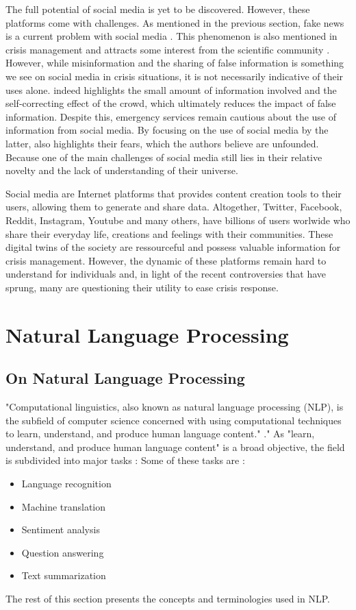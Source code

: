 The full potential of social media is yet to be discovered.
However, these platforms come with challenges.
As mentioned in the previous section, fake news is a current problem with social media \cite{lazerScienceFakeNews2018,vosoughiSpreadTrueFalse2018}.
This phenomenon is also mentioned in crisis management and attracts some interest from the scientific community \cite{starbirdExaminingAlternativeMedia2017,sellMisinformationUSEbola2020}.
However, while misinformation and the sharing of false information is something we see on social media in crisis situations, it is not necessarily indicative of their uses alone.
\cite{bubendorffConstructionDisseminationInformation2021} indeed highlights the small amount of information involved and the self-correcting effect of the crowd, which ultimately reduces the impact of false information.
Despite this, emergency services remain cautious about the use of information from social media.
By focusing on the use of social media by the latter, \cite{tapiaGoodEnoughGood2014} also highlights their fears, which the authors believe are unfounded.
Because one of the main challenges of social media still lies in their relative novelty and the lack of understanding of their universe.

Social media are Internet platforms that provides content creation tools to their users, allowing them to generate and share data.
Altogether, Twitter, Facebook, Reddit, Instagram, Youtube and many others, have billions of users worlwide who share their everyday life, creations and feelings with their communities.
These digital twins of the society are ressourceful and possess valuable information for crisis management.
However, the dynamic of these platforms remain hard to understand for individuals and, in light of the recent controversies that have sprung, many are questioning their utility to ease crisis response.

\section{Natural Language Processing}
\subsection{On Natural Language Processing}
"Computational linguistics, also known as natural language processing (NLP), is the subfield of computer science concerned with using computational techniques to learn, understand, and produce human language content." \cite{hirschbergAdvancesNaturalLanguage2015}."
As "learn, understand, and produce human language content" is a broad objective, the field is subdivided into major tasks :
Some of these tasks are :
\begin{itemize}
    \item Language recognition
    \item Machine translation
    \item Sentiment analysis
    \item Question answering
    \item Text summarization
\end{itemize}
The rest of this section presents the concepts and terminologies used in NLP.

